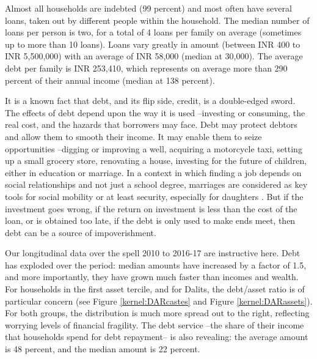 \documentclass[a4paper, 11pt, onecolumn]{article}
\begin{document}
Almost all households are indebted (99 percent) and most often have several loans, taken out by different people within the household.
The median number of loans per person is two, for a total of 4 loans per family on average (sometimes up to more than 10 loans). 
Loans vary greatly in amount (between INR 400 to INR 5,500,000) with an average of INR 58,000 (median at 30,000). 
The average debt per family is INR 253,410, which represents on average more than 290 percent of their annual income (median at 138 percent).

It is a known fact that debt, and its flip side, credit, is a double-edged sword. 
The effects of debt depend upon the way it is used --investing or consuming, the real cost, and the hazards that borrowers may face. 
Debt may protect debtors and allow them to smooth their income. 
It may enable them to seize opportunities --digging or improving a well, acquiring a motorcycle taxi, setting up a small grocery store, renovating a house, investing for the future of children, either in education or marriage. 
In a context in which finding a job depends on social relationships and not just a school degree, marriages are considered as key tools for social mobility or at least security, especially for daughters \citep{DeNeve2016}. 
But if the investment goes wrong, if the return on investment is less than the cost of the loan, or is obtained too late, if the debt is only used to make ends meet, then debt can be a source of impoverishment. 

Our longitudinal data over the spell 2010 to 2016-17 are instructive here.
Debt has exploded over the period: median amounts have increased by a factor of 1.5, and more importantly, they have grown much faster than incomes and wealth. 
For households in the first asset tercile, and for Dalits, the debt/asset ratio is of particular concern (see Figure \ref{kernel:DARcastes} and Figure \ref{kernel:DARassets}). 
For both groups, the distribution is much more spread out to the right, reflecting worrying levels of financial fragility. 
The debt service --the share of their income that households spend for debt repayment-- is also revealing: the average amount is 48 percent, and the median amount is 22 percent. 
\end{document}

